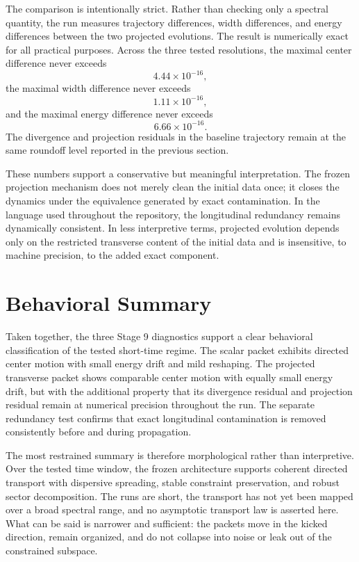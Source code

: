 \documentclass[11pt]{article}
\begin{document}
The comparison is intentionally strict. Rather than checking only a spectral quantity, the run measures trajectory differences, width differences, and energy differences between the two projected evolutions. The result is numerically exact for all practical purposes. Across the three tested resolutions, the maximal center difference never exceeds
\begin{equation}
4.44\times 10^{-16},
\end{equation}
the maximal width difference never exceeds
\begin{equation}
1.11\times 10^{-16},
\end{equation}
and the maximal energy difference never exceeds
\begin{equation}
6.66\times 10^{-16}.
\end{equation}
The divergence and projection residuals in the baseline trajectory remain at the same roundoff level reported in the previous section.

These numbers support a conservative but meaningful interpretation. The frozen projection mechanism does not merely clean the initial data once; it closes the dynamics under the equivalence generated by exact contamination. In the language used throughout the repository, the longitudinal redundancy remains dynamically consistent. In less interpretive terms, projected evolution depends only on the restricted transverse content of the initial data and is insensitive, to machine precision, to the added exact component.

\section{Behavioral Summary}
Taken together, the three Stage 9 diagnostics support a clear behavioral classification of the tested short-time regime. The scalar packet exhibits directed center motion with small energy drift and mild reshaping. The projected transverse packet shows comparable center motion with equally small energy drift, but with the additional property that its divergence residual and projection residual remain at numerical precision throughout the run. The separate redundancy test confirms that exact longitudinal contamination is removed consistently before and during propagation.

The most restrained summary is therefore morphological rather than interpretive. Over the tested time window, the frozen architecture supports coherent directed transport with dispersive spreading, stable constraint preservation, and robust sector decomposition. The runs are short, the transport has not yet been mapped over a broad spectral range, and no asymptotic transport law is asserted here. What can be said is narrower and sufficient: the packets move in the kicked direction, remain organized, and do not collapse into noise or leak out of the constrained subspace.
\end{document}
